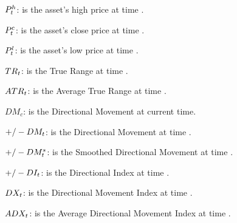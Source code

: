 \documentclass{article}
\begin{document}
$P_{t}^{h}$: is the asset's high price at time \currenttime.

$P_{t}^{c}$: is the asset's close price at time \currenttime.

$P_{t}^{l}$: is the asset's low price at time \currenttime.

$TR_{t}$: is the True Range at time \currenttime.

$ATR_{t}$: is the Average True Range at time \currenttime.

$DM_{c}$: is the Directional Movement at current time.

$+/-DM_{t}$: is the Directional Movement at time \currenttime.

$+/-DM_{t}^{s}$: is the Smoothed Directional Movement at time \currenttime.

$+/-DI_{t}$: is the Directional Index at time \currenttime.

$DX_{t}$: is the Directional Movement Index at time \currenttime.

$ADX_{t}$: is the Average Directional Movement Index at time \currenttime.


\keyterms
\furtherlinks %
\end{document}
